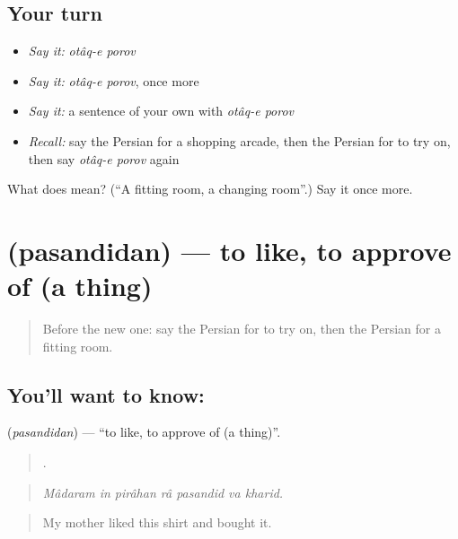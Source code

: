\subsection*{Your turn}
\begin{itemize}
\raggedright
  \item \emph{Say it:} \emph{otâq-e porov}
  \item \emph{Say it:} \emph{otâq-e porov}, once more
  \item \emph{Say it:} a sentence of your own with \emph{otâq-e porov}
  \item \emph{Recall:} say the Persian for a shopping arcade, then the Persian for to try on, then say \emph{otâq-e porov} again
\end{itemize}

\begin{tcolorbox}[breakable,colback=teal!4,colframe=teal!35!black,title={Before you move on}]
What does   mean? (\textquotedblleft{}A fitting room, a changing room\textquotedblright{}.) Say it once more.
\end{tcolorbox}
\section[\texorpdfstring{\fa{پسندیدن} (pasandidan)}{پسندیدن (pasandidan)}]{ (pasandidan) — to like, to approve of (a thing)}

\label{lesson:FA-C460-pasandidan}



\begin{quote}
Before the new one: say the Persian for to try on, then the Persian for a fitting room.
\end{quote}

\subsection*{You'll want to know: }
\textbf{} (\emph{pasandidan}) — \textquotedblleft{}to like, to approve of (a thing)\textquotedblright{}.

\begin{quote}
      .
\end{quote}

\begin{quote}
\emph{Mâdaram in pirâhan râ pasandid va kharid.}
\end{quote}

\begin{quote}
My mother liked this shirt and bought it.
\end{quote}


